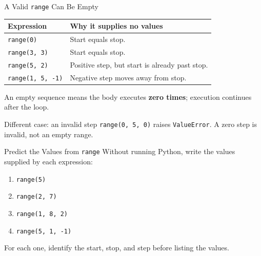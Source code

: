 \documentclass[aspectratio=169,10pt]{beamer}
\begin{document}
\begin{frame}{A Valid \texttt{range} Can Be Empty}
  \begin{center}
    \renewcommand{\arraystretch}{1.35}
    \begin{tabular}{l|l}
      \textbf{Expression} & \textbf{Why it supplies no values} \\\hline
      \texttt{range(0)} & Start equals stop. \\
      \texttt{range(3, 3)} & Start equals stop. \\
      \texttt{range(5, 2)} & Positive step, but start is already past stop. \\
      \texttt{range(1, 5, -1)} & Negative step moves away from stop.
    \end{tabular}
  \end{center}
  An empty sequence means the body executes \textbf{zero times}; execution continues after the loop.
  \begin{alertblock}{Different case: an invalid step}
    \texttt{range(0, 5, 0)} raises \texttt{ValueError}. A zero step is invalid, not an empty range.
  \end{alertblock}
\end{frame}

\begin{frame}{Predict the Values from \texttt{range}}
  Without running Python, write the values supplied by each expression:

  \begin{enumerate}
    \item \texttt{range(5)}
    \item \texttt{range(2, 7)}
    \item \texttt{range(1, 8, 2)}
    \item \texttt{range(5, 1, -1)}
  \end{enumerate}

  \begin{activity}
    For each one, identify the start, stop, and step before listing the values.
  \end{activity}
\end{frame}
\end{document}
